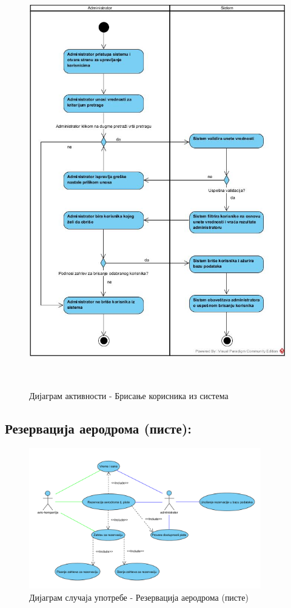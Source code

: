 \documentclass{article}
\begin{document}
\begin{figure}[H]
    \centering
    \includegraphics[width=1.1\textwidth, height=18cm]{Dijagrami_slike/brisanje_korisnika.jpg}
    \caption{Дијаграм активности - Брисање корисника из система}
\end{figure}

\subsection{Резервација аеродрома (писте):}

\begin{figure}[H]
    \centering
    \includegraphics[width=0.9\textwidth]{Dijagrami_slike/ucs_rezervacija_aerodroma.png}
    \caption{Дијаграм случаја употребе - Резервација аеродрома (писте)}
\end{figure}
\end{document}
